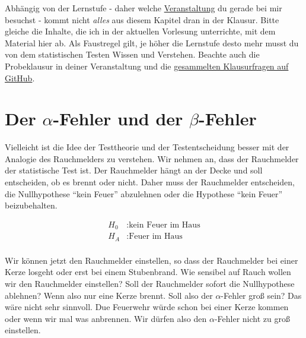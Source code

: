 \documentclass[
  letterpaper,
]{scrbook}
\begin{document}
\begin{tcolorbox}[enhanced jigsaw, coltitle=black, titlerule=0mm, bottomrule=.15mm, opacityback=0, opacitybacktitle=0.6, leftrule=.75mm, title=\textcolor{quarto-callout-caution-color}{\faFire}\hspace{0.5em}{Ein Wort zur Klausur}, toprule=.15mm, bottomtitle=1mm, toptitle=1mm, left=2mm, breakable, arc=.35mm, colback=white, rightrule=.15mm, colbacktitle=quarto-callout-caution-color!10!white, colframe=quarto-callout-caution-color-frame]
Abhängig von der Lernstufe - daher welche
\protect\hyperlink{sec-vorlesungen-hs}{Veranstaltung} du gerade bei mir
besuchst - kommt nicht \emph{alles} aus diesem Kapitel dran in der
Klausur. Bitte gleiche die Inhalte, die ich in der aktuellen Vorlesung
unterrichte, mit dem Material hier ab. Als Faustregel gilt, je höher die
Lernstufe desto mehr musst du von dem statistischen Testen Wissen und
Verstehen. Beachte auch die Probeklausur in deiner Veranstaltung und die
\href{https://github.com/jkruppa/teaching/tree/main/Klausur}{gesammelten
Klausurfragen auf GitHub}.
\end{tcolorbox}

\hypertarget{sec-alpha-beta}{%
\section{\texorpdfstring{Der \(\alpha\)-Fehler und der
\(\beta\)-Fehler}{Der \textbackslash alpha-Fehler und der \textbackslash beta-Fehler}}\label{sec-alpha-beta}}

Vielleicht ist die Idee der Testtheorie und der Testentscheidung besser
mit der Analogie des Rauchmelders zu verstehen. Wir nehmen an, dass der
Rauchmelder der statistische Test ist. Der Rauchmelder hängt an der
Decke und soll entscheiden, ob es brennt oder nicht. Daher muss der
Rauchmelder entscheiden, die Nullhypothese ``kein Feuer'' abzulehnen
oder die Hypothese ``kein Feuer'' beizubehalten.

\[
\begin{align*} 
H_0&: \mbox{kein Feuer im Haus}  \\  
H_A&: \mbox{Feuer im Haus}  \\   
\end{align*}
\]

Wir können jetzt den Rauchmelder einstellen, so dass der Rauchmelder bei
einer Kerze losgeht oder erst bei einem Stubenbrand. Wie sensibel auf
Rauch wollen wir den Rauchmelder einstellen? Soll der Rauchmelder sofort
die Nullhypothese ablehnen? Wenn also nur eine Kerze brennt. Soll also
der \(\alpha\)-Fehler groß sein? Das wäre nicht sehr sinnvoll. Due
Feuerwehr würde schon bei einer Kerze kommen oder wenn wir mal was
anbrennen. Wir dürfen also den \(\alpha\)-Fehler nicht zu groß
einstellen.
\end{document}
